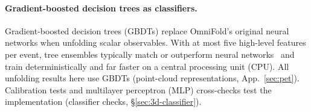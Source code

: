 \paragraph{Gradient-boosted decision trees as classifiers.} Gradient-boosted decision trees (GBDTs) replace OmniFold's original neural networks when unfolding scalar observables. With at most five high-level features per event, tree ensembles typically match or outperform neural networks~\cite{Grinsztajn:2022tabular} and train deterministically and far faster on a central processing unit (CPU). All unfolding results here use GBDTs (point-cloud representations, App.~\ref{sec:pet}). Calibration tests and multilayer perceptron (MLP) cross-checks test the implementation (classifier checks, \S\ref{sec:3d-classifier}).

